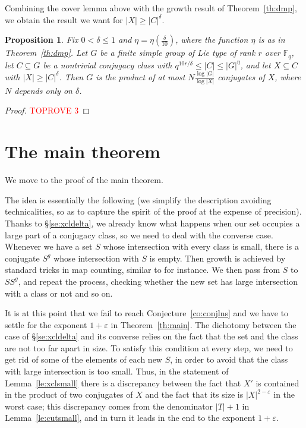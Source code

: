 \documentclass[a4paper]{article}
\newtheorem{proposition}{Proposition}[section]
\theoremstyle{definition}
\numberwithin{equation}{section}
\begin{document}
Combining the cover lemma above with the growth result of Theorem~\ref{th:dmp}, we obtain the result we want for $|X|\geq|C|^{\delta}$.

\begin{proposition}\label{pr:xcldelta}
Fix $0<\delta\leq 1$ and $\eta=\eta\left(\frac{\delta}{10}\right)$, where the function $\eta$ is as in Theorem~\ref{th:dmp}. Let $G$ be a finite simple group of Lie type of rank $r$ over $\mathbb{F}_{q}$, let $C\subseteq G$ be a nontrivial conjugacy class with $q^{10r/\delta}\leq|C|\leq|G|^{\eta}$, and let $X\subseteq C$ with $|X|\geq|C|^{\delta}$. Then $G$ is the product of at most $N\frac{\log|G|}{\log|X|}$ conjugates of $X$, where $N$ depends only on $\delta$.
\end{proposition}

\begin{proof}\textcolor{red}{TOPROVE 3}\end{proof}

\section{The main theorem}\label{se:main}

We move to the proof of the main theorem.

The idea is essentially the following (we simplify the description avoiding technicalities, so as to capture the spirit of the proof at the expense of precision). Thanks to \S\ref{se:xcldelta}, we already know what happens when our set occupies a large part of a conjugacy class, so we need to deal with the converse case. Whenever we have a set $S$ whose intersection with every class is small, there is a conjugate $S^{g}$ whose intersection with $S$ is empty. Then growth is achieved by standard tricks in map counting, similar to \cite[Lemma 2.2]{Hel19b} for instance. We then pass from $S$ to $SS^{g}$, and repeat the process, checking whether the new set has large intersection with a class or not and so on.

It is at this point that we fail to reach Conjecture~\ref{co:conjlns} and we have to settle for the exponent $1+\varepsilon$ in Theorem~\ref{th:main}. The dichotomy between the case of \S\ref{se:xcldelta} and its converse relies on the fact that the set and the class are not too far apart in size. To satisfy this condition at every step, we need to get rid of some of the elements of each new $S$, in order to avoid that the class with large intersection is too small. Thus, in the statement of Lemma~\ref{le:xclsmall} there is a discrepancy between the fact that $X'$ is contained in the product of two conjugates of $X$ and the fact that its size is $|X|^{2-\varepsilon}$ in the worst case; this discrepancy comes from the denominator $|T|+1$ in Lemma~\ref{le:cutsmall}, and in turn it leads in the end to the exponent $1+\varepsilon$.
\end{document}
